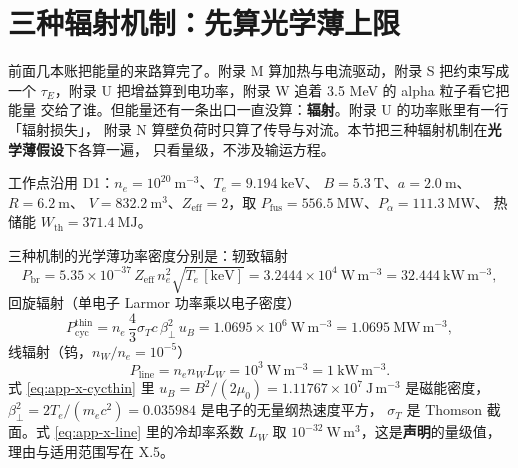 
\section{三种辐射机制：先算光学薄上限}
\label{sec:app-x-three}

前面几本账把能量的来路算完了。附录 M 算加热与电流驱动，附录 S 把约束写成一个
$\tau_E$，附录 U 把增益算到电功率，附录 W 追着 3.5 MeV 的 alpha 粒子看它把能量
交给了谁。但能量还有一条出口一直没算：\textbf{辐射}。附录 U 的功率账里有一行「辐射损失」，
附录 N 算壁负荷时只算了传导与对流。本节把三种辐射机制在\textbf{光学薄假设}下各算一遍，
只看量级，不涉及输运方程。

工作点沿用 D1：$n_e=10^{20}\ \mathrm{m^{-3}}$、$T_e=9.194\ \mathrm{keV}$、
$B=5.3\ \mathrm{T}$、$a=2.0\ \mathrm{m}$、$R=6.2\ \mathrm{m}$、
$V=832.2\ \mathrm{m^3}$、$Z_{\mathrm{eff}}=2$，取
$P_{\mathrm{fus}}=556.5\ \mathrm{MW}$、$P_\alpha=111.3\ \mathrm{MW}$、
热储能 $W_{\mathrm{th}}=371.4\ \mathrm{MJ}$。

三种机制的光学薄功率密度分别是：轫致辐射
\begin{equation}
P_{\mathrm{br}} = 5.35\times10^{-37}\,Z_{\mathrm{eff}}\,n_e^2\sqrt{T_e\,[\mathrm{keV}]}
= 3.2444\times10^{4}\ \mathrm{W\,m^{-3}} = 32.444\ \mathrm{kW\,m^{-3}},
\label{eq:app-x-brnum}
\end{equation}
回旋辐射（单电子 Larmor 功率乘以电子密度）
\begin{equation}
P_{\mathrm{cyc}}^{\mathrm{thin}} = n_e\,\frac{4}{3}\sigma_T c\,\beta_\perp^2\,u_B
= 1.0695\times10^{6}\ \mathrm{W\,m^{-3}} = 1.0695\ \mathrm{MW\,m^{-3}},
\label{eq:app-x-cycthin}
\end{equation}
线辐射（钨，$n_W/n_e=10^{-5}$）
\begin{equation}
P_{\mathrm{line}} = n_e n_W L_W = 10^{3}\ \mathrm{W\,m^{-3}} = 1\ \mathrm{kW\,m^{-3}}.
\label{eq:app-x-line}
\end{equation}
式 \eqref{eq:app-x-cycthin} 里 $u_B=B^2/(2\mu_0)=1.11767\times10^{7}\ \mathrm{J\,m^{-3}}$
是磁能密度，$\beta_\perp^2=2T_e/(m_ec^2)=0.035984$ 是电子的无量纲热速度平方，
$\sigma_T$ 是 Thomson 截面。式 \eqref{eq:app-x-line} 里的冷却率系数 $L_W$ 取
$10^{-32}\ \mathrm{W\,m^3}$，这是\textbf{声明}的量级值，理由与适用范围写在 X.5。

